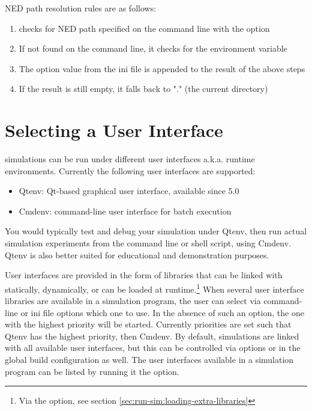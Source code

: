 NED path resolution rules are as follows:

\begin{enumerate}
  \item {\opp} checks for NED path specified on the command line with the  option
  \item If not found on the command line, it checks for the  environment variable
  \item The  option value from the ini file is appended to the result of the above steps
  \item If the result is still empty, it falls back to "." (the current directory)
\end{enumerate}


\section{Selecting a User Interface}
\label{sec:run-sim:selecting-user-interface}

{\opp} simulations can be run under different user interfaces a.k.a. runtime
environments. Currently the following user interfaces are supported:

\begin{itemize}
  \item Qtenv: Qt-based graphical user interface, available since {\opp} 5.0
  \item Cmdenv: command-line user interface for batch execution
\end{itemize}

You would typically test and debug your simulation under Qtenv,
then run actual simulation experiments from the command line or shell
script, using Cmdenv. Qtenv is also better suited for
educational and demonstration purposes.

User interfaces are provided in the form of libraries that can be linked with
statically, dynamically, or can be loaded at runtime.\footnote{Via the 
option, see section \ref{sec:run-sim:loading-extra-libraries}} When several user
interface libraries are available in a simulation program, the user can select
via command-line or ini file options which one to use. In the absence of such an
option, the one with the highest priority will be started. Currently priorities
are set such that Qtenv has the highest priority, then Cmdenv.
By default, simulations are linked with all available user interfaces,
but this can be controlled via  options or in the {\opp}
global build configuration as well. The user interfaces available in a
simulation program can be listed by running it the 
option.

